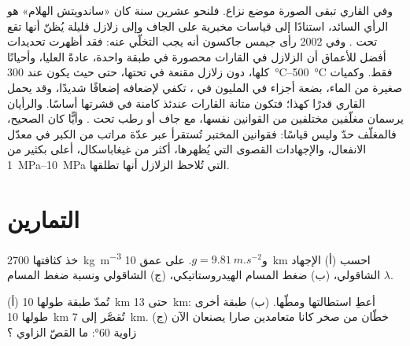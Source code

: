 وفي  القاري تبقى الصورة موضع نزاع. فلنحو عشرين سنة كان «ساندويتش الهلام» هو الرأي السائد، استنادًا إلى قياسات مخبرية على  الجاف وإلى زلازل قليلة يُظنّ أنها تقع تحت . وفي 2002 رأى جيمس جاكسون أنه يجب التخلّي عنه: فقد أظهرت تحديدات أفضل للأعماق أن الزلازل في القارات محصورة في طبقة واحدة، عادةً  العليا، وأحيانًا  كلها، دون زلازل مقنعة في  تحتها، حتى حيث يكون  عند \qtyrange{300}{500}{\degreeCelsius} فقط. وكميات صغيرة من الماء، بضعة أجزاء في المليون في ، تكفي لإضعافه إضعافًا شديدًا، وقد يحمل  القاري قدرًا كهذا؛ فتكون متانة القارات عندئذ كامنة في قشرتها أساسًا. والرأيان يرسمان مغلّفين مختلفين من القوانين نفسها، مع  جاف أو رطب تحت .
وأيًّا كان الصحيح، فالمغلّف حدّ وليس قياسًا: فقوانين المختبر تُستقرأ عبر عدّة مراتب من الكبر في معدّل الانفعال، والإجهادات القصوى التي يُظهرها، أكثر من غيغاباسكال، أعلى بكثير من \qtyrange{1}{10}{MPa} التي تُلاحظ الزلازل أنها تطلقها.

\section{التمارين}

\begin{exercise}[$\star$]\label{exo:b1:stress-strain-rheology:1}
خذ  كثافتها \qty{2700}{kg.m^{-3}} و$g = \qty{9.81}{m.s^{-2}}$. على عمق \qty{10}{km} احسب (أ) الإجهاد الشاقولي، (ب) ضغط المسام الهيدروستاتيكي، (ج)  الشاقولي ونسبة ضغط المسام $\lambda$.
\end{exercise}

\begin{exercise}[$\star$]\label{exo:b1:stress-strain-rheology:2}
(أ) تُمدّ طبقة طولها \qty{10}{km} حتى \qty{13}{km}: أعطِ استطالتها ومطّها. (ب) طبقة أخرى طولها \qty{10}{km} تُقصَّر إلى \qty{7}{km}. (ج) خطّان من صخر كانا متعامدين صارا يصنعان الآن زاوية \ang{60}: ما القصّ الزاوي ؟
\end{exercise}

